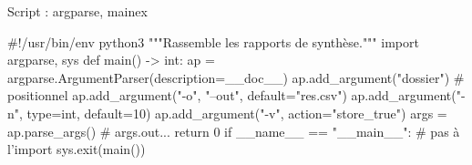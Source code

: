 \documentclass{article}
\begin{document}
\begin{colonne}
\begin{bloc}{Script : argparse, main}{ex}
\begin{code}
#!/usr/bin/env python3
"""Rassemble les rapports de synthèse."""
import argparse, sys
def main() -> int:
    ap = argparse.ArgumentParser(description=__doc__)
    ap.add_argument("dossier")  # positionnel
    ap.add_argument("-o", "--out", default="res.csv")
    ap.add_argument("-n", type=int, default=10)
    ap.add_argument("-v", action="store_true")
    args = ap.parse_args()      # args.out...
    return 0
if __name__ == "__main__":      # pas à l'import
    sys.exit(main())
\end{code}
\end{bloc}
\end{colonne}\colbreak
\end{document}
